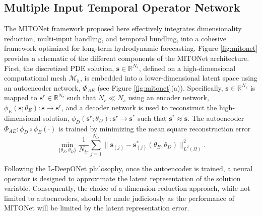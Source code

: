 \documentclass[draft]{agujournal2019}
\begin{document}
\subsection{Multiple Input Temporal Operator Network}

The MITONet framework proposed here effectively integrates dimensionality reduction, multi-input handling, and temporal bundling, into a cohesive framework optimized for long-term hydrodynamic forecasting. Figure \ref{fig:mitonet} provides a schematic of the different components of the MITONet architecture. 
First, the discretized PDE solution, $\mathbf{s} \in \mathbb{R}^{N_s}$, defined on a high-dimensional computational mesh $\mathcal{M}_h$, is embedded into a lower-dimensional latent space using an autoencoder network, $\Phi_{AE}$ (see Figure \ref{fig:mitonet}(a)). Specifically, $\mathbf{s} \in \mathbb{R}^{N_s}$ is mapped to $\mathbf{s}^r \in \mathbb{R}^{N_r}$ such that $N_r \ll N_s$ using an encoder network, $\phi_{E}(\mathbf{s}; \theta_E): \mathbf{s} \rightarrow \mathbf{s}^r$, and a decoder network is used to reconstruct the high-dimensional solution,  
$\phi_{D}(\mathbf{s}^r;\theta_D): \mathbf{s}^r \rightarrow \mathbf{s}^*$ such that $\mathbf{s}^* \approx \mathbf{s}$. The autoencoder $\Phi_{AE}: \phi_{D} \circ \phi_{E}(\cdot)$ is trained by minimizing the mean square reconstruction error
\begin{equation}
\min_{\{\theta_E, \theta_D\}} \frac{1}{N_{tr}} \sum_{j=1}^{N_{tr}} \|\mathbf{s}_{(j)} - \mathbf{s}_{(j)}^*(\theta_E, \theta_D)\|_{L^2(\Omega)}^2.
\end{equation}


Following the L-DeepONet \cite{kontolati2023learning} philosophy, once the autoencoder is trained, a neural operator is designed to approximate the latent representation of the solution variable. Consequently, the choice of a dimension reduction approach, while not limited to autoencoders, should be made judiciously as the performance of MITONet will be limited by the latent representation error.
\end{document}
